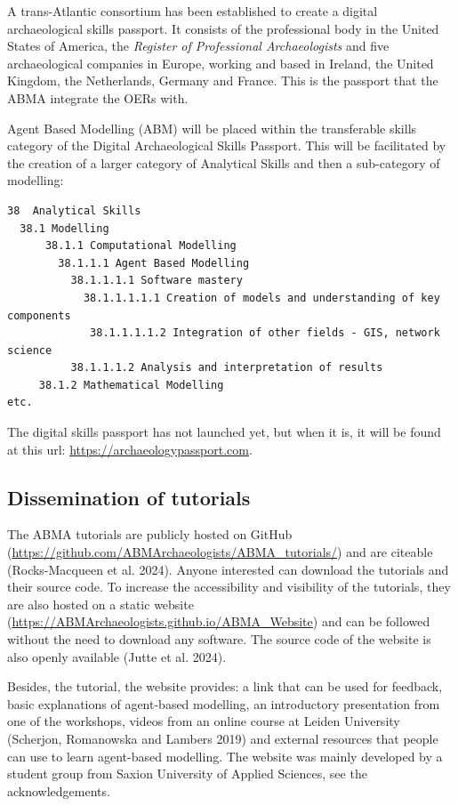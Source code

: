 \documentclass[
]{article}
\begin{document}
A trans-Atlantic consortium has been established to create a digital archaeological skills passport. It consists of the professional body in the United States of America, the \emph{Register of Professional Archaeologists} and five archaeological companies in Europe, working and based in Ireland, the United Kingdom, the Netherlands, Germany and France. This is the passport that the ABMA integrate the OERs with.~

Agent Based Modelling (ABM) will be placed within the transferable skills category of the Digital Archaeological Skills Passport. This will be facilitated by the creation of a larger category of Analytical Skills and then a sub-category of modelling:

\begin{verbatim}
38  Analytical Skills
  38.1 Modelling
      38.1.1 Computational Modelling
        38.1.1.1 Agent Based Modelling
          38.1.1.1.1 Software mastery
            38.1.1.1.1.1 Creation of models and understanding of key components
             38.1.1.1.1.2 Integration of other fields - GIS, network science
          38.1.1.1.2 Analysis and interpretation of results
     38.1.2 Mathematical Modelling
etc.
\end{verbatim}

The digital skills passport has not launched yet, but when it is, it will be found at this url: \url{https://archaeologypassport.com}.

\hypertarget{dissemination-of-tutorials}{%
\subsection{Dissemination of tutorials}\label{dissemination-of-tutorials}}

The ABMA tutorials are publicly hosted on GitHub (\url{https://github.com/ABMArchaeologists/ABMA_tutorials/}) and are citeable (Rocks-Macqueen et al. 2024). Anyone interested can download the tutorials and their source code. To increase the accessibility and visibility of the tutorials, they are also hosted on a static website (\href{https://ABMArchaeologists.github.io/ABMA_Website/\#/}{https://ABMArchaeologists.github.io/ABMA\_Website}) and can be followed without the need to download any software. The source code of the website is also openly available (Jutte et al. 2024).

Besides, the tutorial, the website provides: a link that can be used for feedback, basic explanations of agent-based modelling, an introductory presentation from one of the workshops, videos from an online course at Leiden University (Scherjon, Romanowska and Lambers 2019) and external resources that people can use to learn agent-based modelling. The website was mainly developed by a student group from Saxion University of Applied Sciences, see the acknowledgements.
\end{document}
